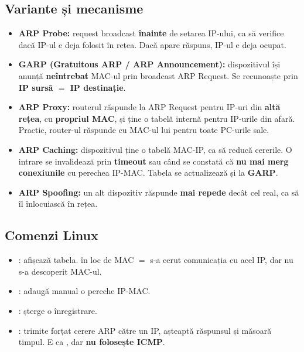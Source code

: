 \documentclass[11pt,a4paper]{article}
\begin{document}
\subsection*{Variante și mecanisme}
\begin{itemize}
  \item \textbf{ARP Probe:} request broadcast \textbf{înainte} de setarea IP-ului, ca să verifice dacă IP-ul e deja folosit în rețea. Dacă apare răspuns, IP-ul e deja ocupat.
  \item \textbf{GARP (Gratuitous ARP / ARP Announcement):} dispozitivul își anunță \textbf{neîntrebat} MAC-ul prin broadcast ARP Request. Se recunoaște prin \textbf{IP sursă $=$ IP destinație}.
  \item \textbf{ARP Proxy:} routerul răspunde la ARP Request pentru IP-uri din \textbf{altă rețea}, cu \textbf{propriul MAC}, și ține o tabelă internă pentru IP-urile din afară. Practic, router-ul răspunde cu MAC-ul lui pentru toate PC-urile sale.
  \item \textbf{ARP Caching:} dispozitivul ține o tabelă MAC-IP, ca să reducă cererile. O intrare se invalidează prin \textbf{timeout} sau când se constată că \textbf{nu mai merg conexiunile} cu perechea IP-MAC. Tabela se actualizează și la \textbf{GARP}.
  \item \textbf{ARP Spoofing:} un alt dispozitiv răspunde \textbf{mai repede} decât cel real, ca să îl înlocuiască în rețea.
\end{itemize}

\subsection*{Comenzi Linux}
\begin{itemize}
  \item {}: afișează tabela.  în loc de MAC $=$ s-a cerut comunicația cu acel IP, dar nu s-a descoperit MAC-ul.
  \item {}: adaugă manual o pereche IP-MAC.
  \item {}: șterge o înregistrare.
  \item {}: trimite forțat cerere ARP către un IP, așteaptă răspunsul și măsoară timpul. E ca , dar \textbf{nu folosește ICMP}.
\end{itemize}
\end{document}
